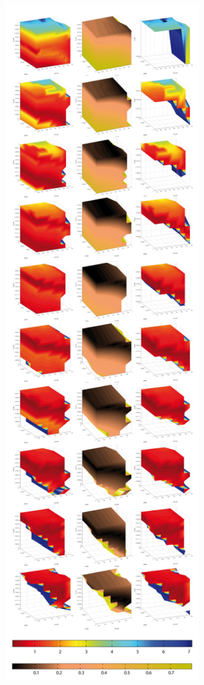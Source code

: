 \begin{figure}
\begin{center}
\includegraphics[width=0.8\textwidth]{../../images/Cases_Studies/Case_0_Yolk/4D/fusion_vertical.png}

\end{center}
\end{figure}
